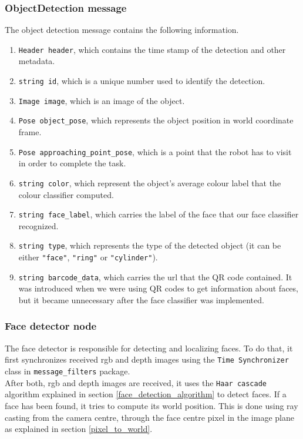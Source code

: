 \documentclass[12pt,a4paper]{article}
\begin{document}
	\subsubsection{ObjectDetection message} \label{objectDetection}
	The object detection message contains the following information.
	\begin{enumerate}
		\item \texttt{Header header}, which contains the time stamp of the detection and other metadata.
		\item \texttt{string id}, which is a unique number used to identify the detection.
		\item \texttt{Image image}, which is an image of the object.
		\item \texttt{Pose object\_pose}, which represents the object position in world coordinate frame.
		\item \texttt{Pose approaching\_point\_pose}, which is a point that the robot has to visit in order to complete the task.
		\item \texttt{string color}, which represent the object's average colour label that the colour classifier computed.
		\item \texttt{string face\_label}, which carries the label of the face that our face classifier recognized.
		\item \texttt{string type}, which represents the type of the detected object (it can be either \texttt{"face"}, \texttt{"ring"} or \texttt{"cylinder"}).
		\item \texttt{string barcode\_data}, which carries the url that the QR code contained. It was introduced when we were using QR codes to get information about faces, but it became unnecessary after the face classifier was implemented.
	\end{enumerate}
	
	\subsubsection{Face detector node}
	The face detector is responsible for detecting and localizing faces. To do that, it first synchronizes received rgb and depth images using the \texttt{Time Synchronizer} class in \texttt{message\_filters} package. \\

	After both, rgb and depth images are received, it uses the \texttt{Haar cascade} algorithm explained in section \ref{face_detection_algorithm} to detect faces. If a face has been found, it tries to compute its world position. This is done using ray casting from the camera centre, through the face centre pixel in the image plane as explained in section \ref{pixel_to_world}. \\
\end{document}

